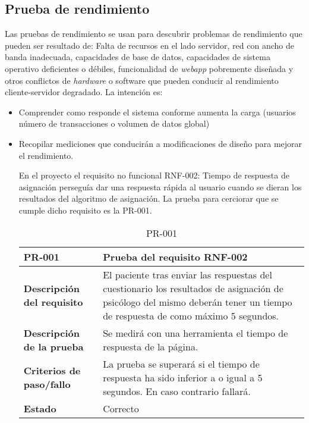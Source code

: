 \subsection{Prueba de rendimiento}


Las pruebas de rendimiento se usan para descubrir problemas de rendimiento que pueden ser resultado de: Falta de recursos en el lado servidor, red con ancho de banda inadecuada, capacidades de base de datos, capacidades de sistema operativo deficientes o débiles, funcionalidad de \textit{webapp} pobremente diseñada y otros conflictos de \textit{hardware} o software que pueden conducir al rendimiento cliente-servidor degradado. La intención es: 


\begin{itemize}
\item Comprender como responde el sistema conforme aumenta la carga (usuarios número de transacciones o volumen de datos global) 
\item Recopilar mediciones que conducirán a modificaciones de diseño para mejorar el rendimiento.


En el proyecto el requisito no funcional RNF-002: Tiempo de respuesta de asignación perseguía dar una respuesta rápida al usuario cuando se dieran los resultados del algoritmo de asignación. La prueba para cerciorar que se cumple dicho requisito es la PR-001.


\begin{table}[htpb]
\centering
\begin{tabularx}{\textwidth}{|l|X|}
\hline
\rowcolor[gray]{0.9}\textbf{PR-001}                     & \textbf{Prueba del requisito RNF-002}                                                                                                                                      \\ \hline
\textbf{Descripción del requisito} & El paciente tras enviar las respuestas del cuestionario los resultados de asignación de psicólogo del mismo deberán tener un tiempo de respuesta de como máximo 5 segundos. \\ \hline
\textbf{Descripción de la prueba}  & Se medirá con una herramienta el tiempo de respuesta de la página.                                                                                                         \\ \hline
\textbf{Criterios de paso/fallo}   & La prueba se superará si el tiempo de respuesta ha sido inferior a o igual a 5 segundos. En caso contrario fallará.                                                        \\ \hline
\textbf{Estado}                    & Correcto                                                                                                                                                                   \\ \hline
\end{tabularx}
\caption{PR-001}
\end{table}

\end{itemize}